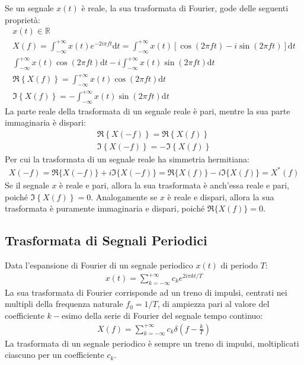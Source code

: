 \documentclass{article}
\newcommand{\df}{\mathrm{d}}
\numberwithin{equation}{subsection}
\begin{document}
Se un segnale $x(t)$ è reale, la sua trasformata di Fourier, gode delle seguenti proprietà:
\begin{gather*}
    x(t)\in\mathbb{R}\\
    X(f)=\displaystyle\int_{-\infty}^{+\infty}x(t)e^{-2i\pi ft}\df t=\int_{-\infty}^{+\infty}x(t)\left[\cos(2\pi ft)-i\sin(2\pi ft)\right]\df t\\
    \displaystyle\int_{-\infty}^{+\infty}x(t)\cos(2\pi ft)\df t-i\int_{-\infty}^{+\infty}x(t)\sin(2\pi ft)\df t\\
    \Re\left\{X(f)\right\}=\displaystyle\int_{-\infty}^{+\infty}x(t)\cos(2\pi ft)\df t\\
    \Im\left\{X(f)\right\}=\displaystyle-\int_{-\infty}^{+\infty}x(t)\sin(2\pi ft)\df t
\end{gather*}
La parte reale della trasformata di un segnale reale è pari, mentre la sua parte immaginaria è dispari:
\begin{gather}
    \Re\left\{X(-f)\right\}=\Re\left\{X(f)\right\}\\
    \Im\left\{X(-f)\right\}=-\Im\left\{X(f)\right\}
\end{gather}
Per cui la trasformata di un segnale reale ha simmetria hermitiana:
\begin{gather}
    X(-f)=\Re\{X(-f)\}+i\Im\{X(-f)\}=\Re\{X(f)\}-i\Im\{X(f)\}=X^*(f)
\end{gather}
Se il segnale $x$ è reale e pari, allora la sua trasformata è anch'essa reale e pari, poiché $\Im\left\{X(f)\right\}=0$. 
Analogamente se $x$ è reale e dispari, allora la sua trasformata è puramente immaginaria e dispari, poiché $\Re\{X(f)\}=0$. 

\subsection{Trasformata di Segnali Periodici}

Data l'espansione di Fourier di un segnale periodico $x(t)$ di periodo $T$:
\begin{gather*}
    x(t)=\displaystyle\sum_{k=-\infty}^{+\infty}c_ke^{2i\pi kt/T}
\end{gather*}
La sua trasformata di Fourier corrisponde ad un treno di impulsi, centrati nei multipli della frequenza naturale $f_0=1/T$, di ampiezza pari al valore del coefficiente $k-$esimo 
della serie di Fourier del segnale tempo continuo: 
\begin{gather*}
    X(f)=\displaystyle\sum_{k=-\infty}^{+\infty}c_k\delta\left(f-\frac{k}{T}\right)
\end{gather*}
La trasformata di un segnale periodico è sempre un treno di impulsi, moltiplicati ciascuno per un coefficiente $c_k$.
\end{document}
